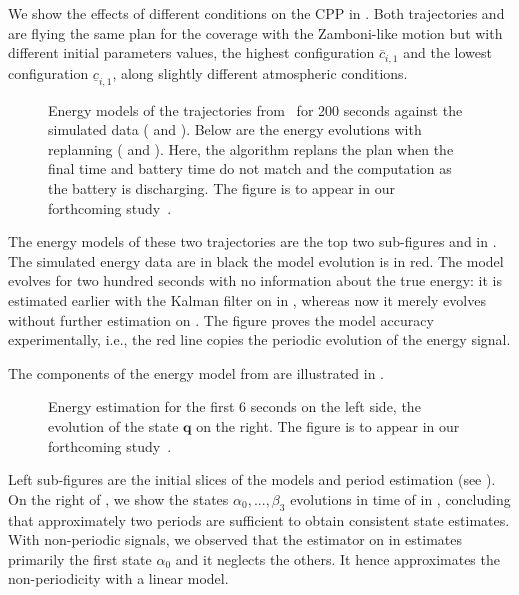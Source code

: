 We show the effects of different conditions on the CPP in . Both trajectories  and  are flying the same plan for the coverage with the Zamboni-like motion but with different initial parameters values, the highest configuration $\overline{c}_{i,1}$ and the lowest configuration $\underline{c}_{i,1}$, along slightly different atmospheric conditions. 
\begin{figure}[h!]
  \centering
  \selectfont
  \footnotesize    
  
  \caption[Numerical simulations of the energy models with static and dynamic plans]{Energy models of the trajectories from~ for 200 seconds against the simulated data ( and ). Below are the energy evolutions with replanning ( and ). Here, the algorithm replans the plan when the final time and battery time do not match and the computation as the battery is discharging. The figure is to appear in our forthcoming study~\citep{seewald202Xenergy}.}
  \label{fig:ener-revised}
\end{figure}
The energy models of these two trajectories are the top two sub-figures  and  in . The simulated energy data are in black the model evolution is in red. The model evolves for two hundred seconds with no information about the true energy: it is estimated earlier with the Kalman filter on  in , whereas now it merely evolves without further estimation on . The figure proves the model accuracy experimentally, i.e., the red line copies the periodic evolution of the energy signal.

The components of the energy model from  are illustrated in . 
\begin{figure}[h!]
  \centering
  \selectfont
  \footnotesize    
  
  \caption[Energy and period estimations and evolution of the state]{Energy estimation for the first 6 seconds on the left side, the evolution of the state $\mathbf{q}$ on the right. The figure is to appear in our forthcoming study~\citep{seewald202Xenergy}.}
  \label{fig:evols-revised}
\end{figure}
Left sub-figures are the initial slices of the models and period estimation (see ). On the right of , we show the states $\alpha_0,...,\beta_3$ evolutions in time of  in , concluding that approximately two periods are sufficient to obtain consistent state estimates. With non-periodic signals, we observed that the estimator on  in  estimates primarily the first state $\alpha_0$ and it neglects the others. It hence approximates the non-periodicity with a linear model.

